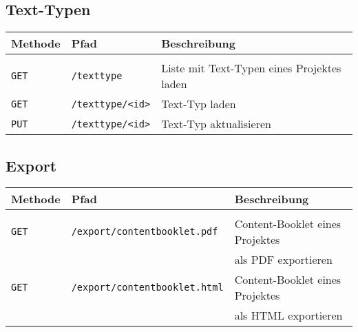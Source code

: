 \subsection{Text-Typen}

\begin{tabular}{@{}l l l}
\textbf{Methode} & \textbf{Pfad} & \textbf{Beschreibung}\\
\hline\\[-1.5ex]
\texttt{GET} & \texttt{/texttype} & Liste mit Text-Typen eines Projektes laden\\
\texttt{GET} & \texttt{/texttype/<id>} & Text-Typ laden\\
\texttt{PUT} & \texttt{/texttype/<id>} & Text-Typ aktualisieren\\
\end{tabular}

\subsection{Export}

\begin{tabular}{@{}l l l}
\textbf{Methode} & \textbf{Pfad} & \textbf{Beschreibung}\\
\hline\\[-1.5ex]
\texttt{GET} & \texttt{/export/contentbooklet.pdf} & Content-Booklet eines Projektes\\
&&als PDF exportieren\\
\texttt{GET} & \texttt{/export/contentbooklet.html} & Content-Booklet eines Projektes\\
&&als HTML exportieren\\
\end{tabular}
